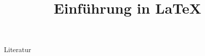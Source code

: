 \documentclass{beamer}
\title{Einf\"uhrung in \LaTeX}
\begin{document}
\begin{frame}
    \titlepage 
\end{frame}

\begin{frame}
    \tableofcontents
\end{frame}







\begin{frame}{Literatur}
    \printbibliography
\end{frame}
\end{document}
